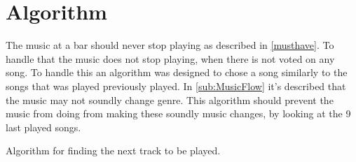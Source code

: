 \section{Algorithm}
\label{sec:algorithm}

The music at a bar should never stop playing as described in \cref{musthave}. To handle that the music does not stop playing, when there is not voted on any song. To handle this an algorithm was designed to chose a song similarly to the songs that was played previously played. In \cref{sub:MusicFlow} it's described that the music may not soundly change genre. This algorithm should prevent the music from doing from making these soundly music changes, by looking at the 9 last played songs.

\begin{algorithm}
\caption{Algorithm for finding the next track to be played.}
\begin{algorithmic}[1]
	 
		\EndIf{}
					\Else{}
					\EndIf{}
				\EndFor{}
			\EndFor{}
		\EndFor{}
			\EndIf{}
		\EndFor{}
			\State{}			
			\EndIf{}
		\EndFor{}
	\EndFunction{}
\end{algorithmic}
\end{algorithm}
